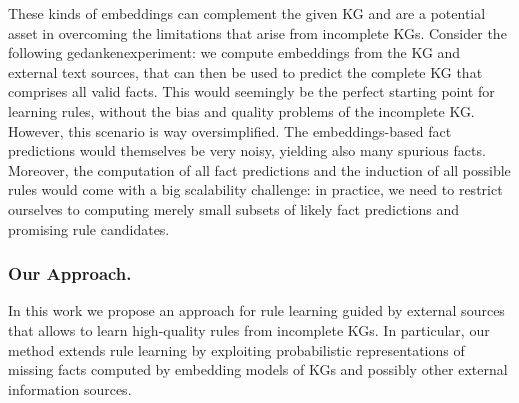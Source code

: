 \documentclass{llncs}
\begin{document}
These kinds of embeddings can complement the given KG and are a potential asset
in overcoming the limitations that arise from incomplete KGs.
Consider the following gedankenexperiment:
we compute embeddings from the KG and external text sources,
that can then be used to predict the complete KG that comprises all valid facts.
This would seemingly be the perfect starting point for learning rules,
without the bias and quality problems of the incomplete KG.
However, this scenario is way oversimplified.
The embeddings-based fact predictions would themselves be very noisy,
yielding also many spurious facts.
Moreover, the computation of all fact predictions and the induction of all
possible rules would come with a big scalability challenge: in practice,
we need to restrict ourselves to computing merely 
small subsets of likely fact predictions
and promising rule candidates.



\subsubsection{Our Approach.}
In this work we propose an approach for rule learning guided by external sources
that allows to learn high-quality rules from incomplete KGs.
In particular, our method extends rule learning
by exploiting probabilistic representations of missing facts 
computed by embedding models of KGs and possibly other external information sources. 
\end{document}
